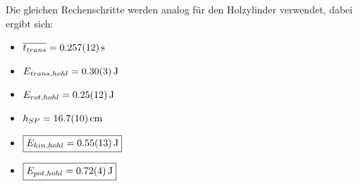 Die gleichen Rechenschritte werden analog für den Holzylinder verwendet, dabei ergibt sich:

\begin{itemize}
    \item $\overline{t_{trans}} = \SI{0,257 \pm 0,012}{\second}$
    \item $E_{trans,hohl} = \SI{0,30 \pm 0,03}{\joule}$
    \item $E_{rot,hohl} = \SI{0,25 \pm 0,12}{\joule}$   
    \item $h_{SP} = \SI{16,7 \pm 1,0}{\cm}$
    \item $\boxed{E_{kin,hohl} = \SI{0,55 \pm 0,13}{\joule}}$
    \item $\boxed{E_{pot,hohl} = \SI{0,72 \pm 0,04}{\joule}}$
\end{itemize}